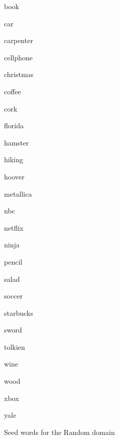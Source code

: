 \begin{figure}[h]
\centering
\caption{Seed words for the Random domain}
\label{fig:seed}
\begin{multicols}{5}
book%

car%

carpenter%

cellphone%

christmas%

coffee%

cork%

florida%

hamster%

hiking

hoover%

metallica%

nbc%

netflix%

ninja%

pencil%

salad%

soccer%

starbucks%

sword%

tolkien%

wine%

wood%

xbox%

yale%
\end{multicols}

\end{figure}

